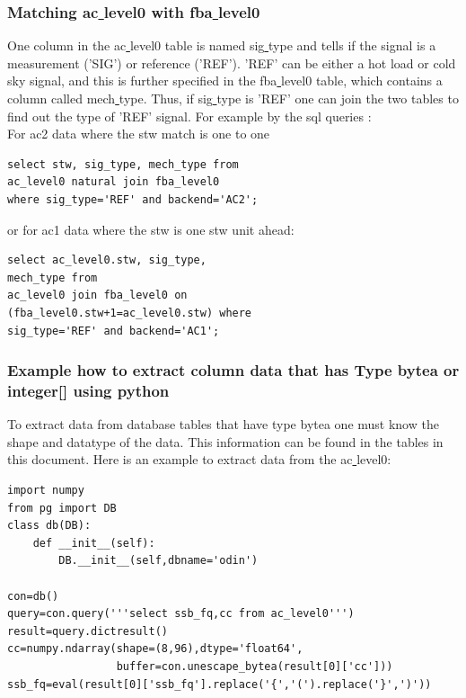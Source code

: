 \documentclass[12pt]{article}
\begin{document}
\subsubsection*{Matching ac\underline{ }level0 with fba\underline{ }level0}
 One column in the ac\underline{ }level0
table is named sig\underline{ }type and tells if the signal is 
a measurement ('SIG') or reference ('REF').
'REF' can be either a hot load or cold sky signal, and this is
further specified in the fba\underline{ }level0 table,
which contains a column called mech\underline{ }type.
Thus, if sig\underline{ }type is 'REF' one can join the two
tables to find out the type of 'REF' signal.
For example by the sql queries :\\
For ac2 data where the stw match is one to one\\
\begin{verbatim}
select stw, sig_type, mech_type from 
ac_level0 natural join fba_level0 
where sig_type='REF' and backend='AC2';
\end{verbatim}
or for ac1 data where the stw is one stw unit ahead:
\begin{verbatim}
select ac_level0.stw, sig_type,
mech_type from 
ac_level0 join fba_level0 on 
(fba_level0.stw+1=ac_level0.stw) where 
sig_type='REF' and backend='AC1';
\end{verbatim}

\subsubsection*{Example how to extract column data that has Type bytea
or integer[] using python}
To extract data from database tables that have type bytea one must
know the shape and datatype of the data. This information
can be found in the tables in this document. Here is an example
to extract data from the ac\underline{ }level0: 

\begin{verbatim}
import numpy
from pg import DB
class db(DB):
    def __init__(self):
        DB.__init__(self,dbname='odin')

con=db()
query=con.query('''select ssb_fq,cc from ac_level0''')
result=query.dictresult()
cc=numpy.ndarray(shape=(8,96),dtype='float64',
                 buffer=con.unescape_bytea(result[0]['cc']))
ssb_fq=eval(result[0]['ssb_fq'].replace('{','(').replace('}',')'))
\end{verbatim}
\clearpage
\newpage
\end{document}
